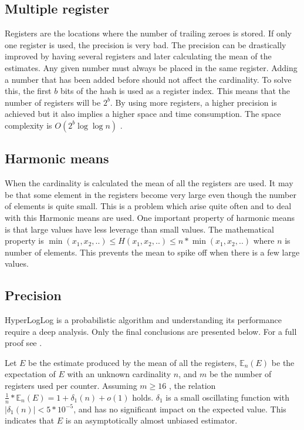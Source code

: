 \subsection{Multiple register}
Registers are the locations where the number of trailing zeroes is stored. If only one register is used, the precision is very bad. The precision can be drastically improved by having several registers and later calculating the mean of the estimates. Any given number must always be placed in the same register. Adding a number that has been added before should not affect the cardinality. To solve this, the first $b$ bits of the hash is used as a register index. This means that the number of registers will be $2^b$. By using more registers, a higher precision is achieved but it also implies a higher space and time consumption. The space complexity is $O(2^b\log\log n)$ \cite{hyperloglog}. 

\subsection{Harmonic means}
When the cardinality is calculated the mean of all the registers are used. It may be that some element in the registers become very large even though the number of elements is quite small. This is a problem which arise quite often and to deal with this Harmonic means are used. One important property of harmonic means is that large values have less leverage than small values. The mathematical property is $\min(x_1,x_2,..) \leq H(x_1,x_2,..) \leq n*\min(x_1,x_2,..)$ where $n$ is number of elements. This prevents the mean to spike off when there is a few large values.  

\subsection{Precision}
HyperLogLog is a probabilistic algorithm and understanding its performance require a deep analysis. Only the final conclusions are presented below. For a full proof see \cite{hyperloglog}. 

Let $E$ be the estimate produced by the mean of all the registers, $\mathbb{E}_n(E)$ be the expectation of $E$ with an unknown cardinality $n$, and $m$ be the number of registers used per counter. Assuming $m \geq 16$ , the relation $\frac{1}{n}*\mathbb{E}_n(E) = 1 + \delta_1(n) + o(1)$ holds. $\delta_1$ is a small oscillating function with $|\delta_1(n)| < 5*10^{-5}$, and has no significant impact on the expected value. This indicates that $E$ is an asymptotically almost unbiased estimator.

